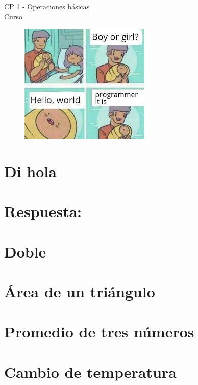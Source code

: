 \begin{center}
    \begin{large}
    CP 1 - Operaciones básicas\\
    Curso \academicyear\\
    \end{large}
    
\begin{figure}[h]
    \centering
    \includegraphics[width=0.4\linewidth]{cp2/hello_world.jpg}
\end{figure}
\end{center}

\section{Di hola}

\ifshowanswers
\section*{Respuesta:}

\fi

\section{Doble}


\section{Área de un triángulo}


\section{Promedio de tres números}


\section{Cambio de temperatura}


